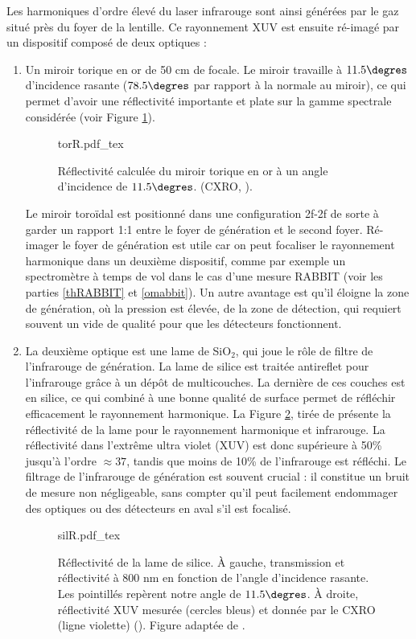 Les harmoniques d'ordre élevé du laser infrarouge sont ainsi générées par le gaz situé près du foyer de la lentille. Ce rayonnement XUV est ensuite ré-imagé par un dispositif composé de deux optiques :
\begin{enumerate}
\item Un miroir torique en or de 50 cm de focale. Le miroir travaille à $11.5\degres$ d'incidence rasante ($78.5\degres$ par rapport à la normale au miroir), ce qui permet d'avoir une réflectivité importante et plate sur la gamme spectrale considérée (voir Figure \ref{Fig:TorR}).

\begin{figure}[!ht]
\centering
\def\svgwidth{0.6\columnwidth}
{torR.pdf_tex}
\caption{Réflectivité calculée du miroir torique en or à un angle d'incidence de $11.5\degres$. (CXRO, ).}
\label{Fig:TorR}
\end{figure}

Le miroir toroïdal est positionné dans une configuration 2f-2f de sorte à garder un rapport 1:1 entre le foyer de génération et le second foyer. Ré-imager le foyer de génération est utile car on peut focaliser le rayonnement harmonique dans un deuxième dispositif, comme par exemple un spectromètre à temps de vol dans le cas d'une mesure RABBIT (voir les parties \ref{thRABBIT} et \ref{omabbit}). Un autre avantage est qu'il éloigne la zone de génération, où la pression est élevée, de la zone de détection, qui requiert souvent un vide de qualité pour que les détecteurs fonctionnent.\\

\item La deuxième optique est une lame de Si$\mbox{O}_{\mbox{2}}$, qui joue le rôle de filtre de l'infrarouge de génération. La lame de silice est traitée antireflet pour l'infrarouge grâce à un dépôt de multicouches. La dernière de ces couches est en silice, ce qui combiné à une bonne qualité de surface permet de réfléchir efficacement le rayonnement harmonique. La Figure \ref{Fig:SilR}, tirée de  présente la réflectivité de la lame pour le rayonnement harmonique et infrarouge. La réflectivité dans l'extrême ultra violet (XUV) est donc supérieure à 50\% jusqu'à l'ordre $\approx 37$, tandis que moins de 10\% de l'infrarouge est réfléchi. Le filtrage de l'infrarouge de génération est souvent crucial : il constitue un bruit de mesure non négligeable, sans compter qu'il peut facilement endommager des optiques ou des détecteurs en aval s'il est focalisé.

\begin{figure}[!ht]
\centering
\def\svgwidth{\columnwidth}
{silR.pdf_tex}
\caption{Réflectivité de la lame de silice. \`{A} gauche, transmission et réflectivité à 800 nm en fonction de l'angle d'incidence rasante. Les pointillés repèrent notre angle de $11.5\degres$. \`{A} droite, réflectivité XUV mesurée (cercles bleus) et donnée par le CXRO (ligne violette) (). Figure adaptée de .}
\label{Fig:SilR}
\end{figure}
\end{enumerate}

